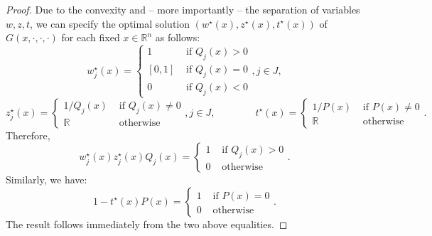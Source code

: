 \documentclass{article}
\newcommand*{\RR}{\mathbb{R}}
\theoremstyle{plain}
\theoremstyle{definition}
\begin{document}
\begin{proof}
    Due to the convexity and -- more importantly -- the separation of variables $w,z,t$, we can specify the optimal solution $(w^\star(x),z^\star(x),t^\star(x))$ of $G(x,\cdot,\cdot,\cdot)$ for each fixed $x \in \RR^n$ as follows:
    \begin{equation*}
        w_j^\star(x) = \begin{cases}
            1 & \text{ if } Q_j(x) > 0\\
            [0,1] & \text{ if } Q_j(x) = 0\\
            0 & \text{ if } Q_j(x) < 0
        \end{cases}, j \in J,
    \end{equation*}
    \begin{equation*}
        z_j^\star(x) = \begin{cases}
            1/Q_j(x) & \text{ if } Q_j(x) \neq 0\\
            \RR & \text { otherwise}
        \end{cases}, j \in J, \qquad\qquad t^\star(x) = \begin{cases}
            1/P(x) & \text{ if } P(x) \neq 0\\
            \RR & \text { otherwise}
        \end{cases}.
    \end{equation*}
    Therefore,
    \begin{equation*}
        w_j^\star(x)z_j^\star(x)Q_j(x) = \begin{cases}
            1 & \text{ if } Q_j(x) > 0 \\
            0 & \text{ otherwise}
        \end{cases}.
    \end{equation*}
    Similarly, we have:
    \begin{equation*}
        1 - t^\star(x)P(x) = \begin{cases}
            1 & \text{ if } P(x) = 0\\
            0 & \text{ otherwise}
        \end{cases}.
    \end{equation*}
    The result follows immediately from the two above equalities.
\end{proof}
\end{document}
